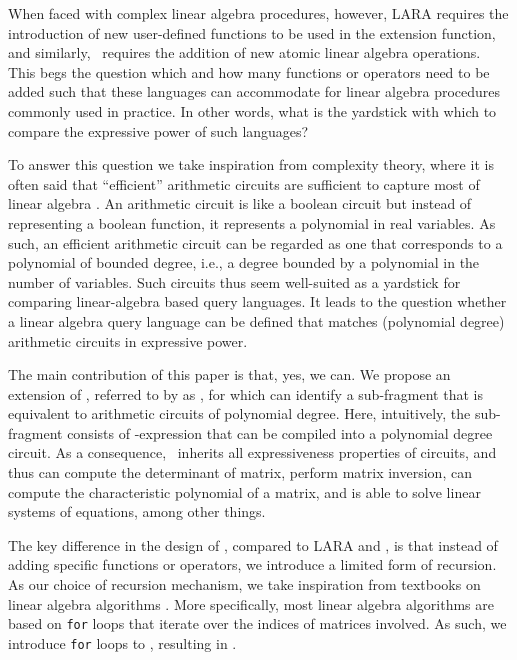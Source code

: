 When faced with complex linear algebra procedures, however, LARA requires the introduction of new user-defined functions to be used in the extension function, and similarly, \lang\ requires the addition of new atomic linear algebra operations. This begs the question which and how many  functions or operators need to be added such that these languages can accommodate for 
linear algebra procedures commonly used in practice. In other words, what is the yardstick with which to compare the expressive power of such languages? 

To answer this question we take inspiration from complexity theory, where it is often said that ``efficient'' arithmetic circuits are sufficient to capture most of linear algebra \cite{}. An arithmetic circuit is like a boolean circuit but instead of representing a boolean function, it represents a polynomial in real variables. As such, an efficient arithmetic circuit can be regarded as one that corresponds to a polynomial of bounded degree, i.e., a degree bounded by a polynomial in the number of variables. Such circuits thus seem well-suited as a yardstick for comparing  linear-algebra based query languages. It leads to the question whether a linear algebra query language can be defined that matches (polynomial degree) arithmetic circuits in expressive power.

The main contribution of this paper is that, yes, we can. We propose an extension of \lang, referred to by as \langfor, for which can identify a sub-fragment that is equivalent to arithmetic circuits of polynomial degree. Here, intuitively, the sub-fragment consists of \langfor-expression that can be compiled into a polynomial degree circuit. As a consequence, \langfor\ inherits all expressiveness properties of circuits, and thus can compute the determinant of matrix, perform matrix inversion, can compute the characteristic polynomial of a matrix, and is able to solve linear systems of equations, among other things.

The key difference in the design of \langfor, compared to LARA and \lang, is that instead of adding specific functions or operators, we introduce a limited form of recursion. As our choice of recursion mechanism, we take inspiration from textbooks on linear algebra algorithms \cite{}. More specifically, most linear algebra algorithms are based on \texttt{for} loops that iterate over the indices of matrices involved. As such, we introduce \texttt{for} loops to \lang, resulting in \langfor.



